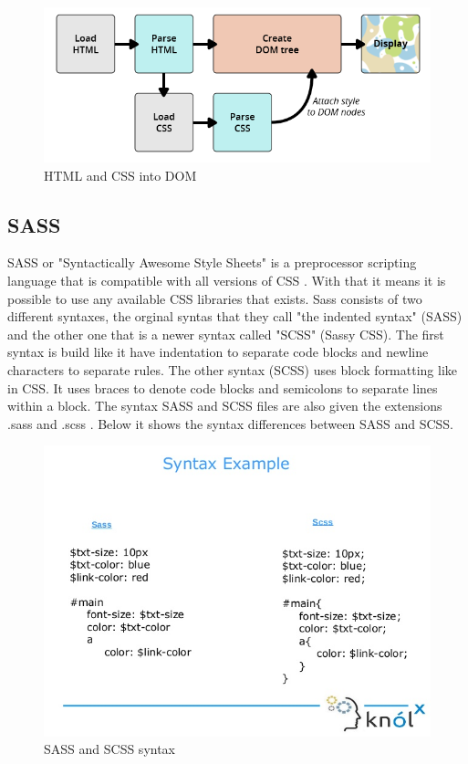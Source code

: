 \begin{figure}[h]
    \centering
    \includegraphics[width=130mm]{figures/DOM.png}
    \caption{HTML and CSS into DOM}
    \label{fig:DOM}
\end{figure}
\clearpage

\subsection{SASS}
SASS or "Syntactically Awesome Style Sheets" is a preprocessor scripting language that is compatible with all versions of CSS \cite{Sass_1}. 
With that it means it is possible to use any available CSS libraries that exists. Sass consists of two different syntaxes, the orginal syntas that they call "the indented syntax" (SASS) and the other one that is a newer syntax called "SCSS" (Sassy CSS)\cite{Sass_2}. 
The first syntax is build like it have indentation to separate code blocks and newline characters to separate rules. The other syntax (SCSS) uses block formatting like in CSS. It uses braces to denote code blocks and semicolons to separate lines within a block. The syntax SASS and SCSS files are also given the extensions .sass and .scss \cite{Sass_2}. 
Below it shows the syntax differences between SASS and SCSS. 

\begin{figure}[h]
    \centering
     \includegraphics[width=115mm,scale=1]{figures/sass_and_scss.png}
    \caption{SASS and SCSS syntax}
    \label{fig:Sass}
\end{figure}


